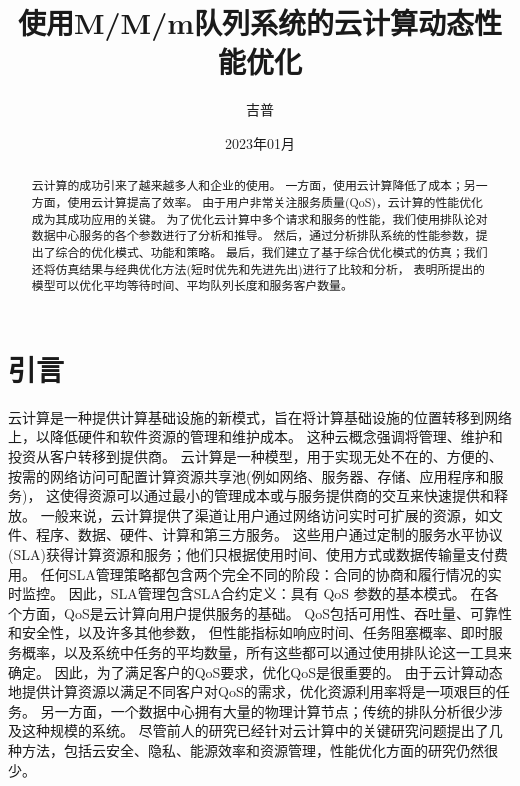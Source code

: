 \documentclass{morningstar}
\title{使用M/M/m队列系统的云计算动态性能优化}
\date{2023年01月}
\author{吉普}
\begin{document}
\setfontformat
\makecover

\clearpage
\startfrontpart
\clearpage

\startmainpart

\showcntitle

\begin{abstract}
    云计算的成功引来了越来越多人和企业的使用。
    一方面，使用云计算降低了成本；另一方面，使用云计算提高了效率。
    由于用户非常关注服务质量(QoS)，云计算的性能优化成为其成功应用的关键。
    为了优化云计算中多个请求和服务的性能，我们使用排队论对数据中心服务的各个参数进行了分析和推导。
    然后，通过分析排队系统的性能参数，提出了综合的优化模式、功能和策略。
    最后，我们建立了基于综合优化模式的仿真；我们还将仿真结果与经典优化方法(短时优先和先进先出)进行了比较和分析，
    表明所提出的模型可以优化平均等待时间、平均队列长度和服务客户数量。
\end{abstract}


\section{引言}
云计算是一种提供计算基础设施的新模式，旨在将计算基础设施的位置转移到网络上，以降低硬件和软件资源的管理和维护成本\cite{key1}。 
这种云概念强调将管理、维护和投资从客户转移到提供商。
云计算是一种模型，用于实现无处不在的、方便的、按需的网络访问可配置计算资源共享池(例如网络、服务器、存储、应用程序和服务)，
这使得资源可以通过最小的管理成本或与服务提供商的交互来快速提供和释放\cite{key2}。
一般来说，云计算提供了渠道让用户通过网络访问实时可扩展的资源，如文件、程序、数据、硬件、计算和第三方服务。
这些用户通过定制的服务水平协议(SLA)获得计算资源和服务；他们只根据使用时间、使用方式或数据传输量支付费用。
任何SLA管理策略都包含两个完全不同的阶段：合同的协商和履行情况的实时监控。
因此，SLA管理包含SLA合约定义：具有 QoS 参数的基本模式。
在各个方面，QoS是云计算向用户提供服务的基础。 
QoS包括可用性、吞吐量、可靠性和安全性，以及许多其他参数，
但性能指标如响应时间、任务阻塞概率、即时服务概率，以及系统中任务的平均数量\cite{key3}，所有这些都可以通过使用排队论这一工具\cite{key4}来确定。
因此，为了满足客户的QoS要求，优化QoS是很重要的。 
由于云计算动态地提供计算资源以满足不同客户对QoS的需求，优化资源利用率将是一项艰巨的任务。
另一方面，一个数据中心拥有大量的物理计算节点\cite{key5}；传统的排队分析很少涉及这种规模的系统。
尽管前人的研究已经针对云计算中的关键研究问题提出了几种方法，包括云安全\cite{key6,key7,key8}、隐私\cite{key9,key10}、能源效率\cite{key11}和资源管理\cite{key12,key13,key14}，性能优化方面的研究仍然很少。
\par
\end{document}
